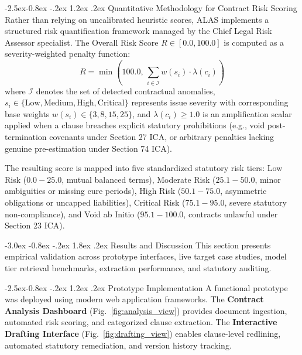 \documentclass[3p,times,procedia]{elsarticle}
\makeatletter
\renewcommand\section{\@startsection {section}{1}{\z@}%
                                   {-3.0ex \@plus -0.8ex \@minus -.2ex}%
                                   {1.8ex \@plus.2ex}%
                                   {\fontsize{10}{12}\selectfont\bfseries\scshape}}
\renewcommand\subsection{\@startsection{subsection}{2}{\z@}%
                                     {-2.5ex\@plus -0.8ex \@minus -.2ex}%
                                     {1.2ex \@plus .2ex}%
                                     {\fontsize{10}{12}\selectfont\itshape}}
\makeatother
\begin{document}
\subsection{Quantitative Methodology for Contract Risk Scoring}
Rather than relying on uncalibrated heuristic scores, ALAS implements a structured risk quantification framework managed by the Chief Legal Risk Assessor specialist. The Overall Risk Score $R \in [0.0, 100.0]$ is computed as a severity-weighted penalty function:
\begin{equation}
R = \min\left(100.0, \, \sum_{i \in \mathcal{I}} w(s_i) \cdot \lambda(c_i) \right)
\end{equation}
where $\mathcal{I}$ denotes the set of detected contractual anomalies, $s_i \in \{\text{Low}, \text{Medium}, \text{High}, \text{Critical}\}$ represents issue severity with corresponding base weights $w(s_i) \in \{3, 8, 15, 25\}$, and $\lambda(c_i) \ge 1.0$ is an amplification scalar applied when a clause breaches explicit statutory prohibitions (e.g., void post-termination covenants under Section 27 ICA, or arbitrary penalties lacking genuine pre-estimation under Section 74 ICA). 

The resulting score is mapped into five standardized statutory risk tiers: Low Risk ($0.0 - 25.0$, mutual balanced terms), Moderate Risk ($25.1 - 50.0$, minor ambiguities or missing cure periods), High Risk ($50.1 - 75.0$, asymmetric obligations or uncapped liabilities), Critical Risk ($75.1 - 95.0$, severe statutory non-compliance), and Void ab Initio ($95.1 - 100.0$, contracts unlawful under Section 23 ICA).

\section{Results and Discussion}
This section presents empirical validation across prototype interfaces, live target case studies, model tier retrieval benchmarks, extraction performance, and statutory auditing.

\subsection{Prototype Implementation}
A functional prototype was deployed using modern web application frameworks. The \textbf{Contract Analysis Dashboard} (Fig.~\ref{fig:analysis_view}) provides document ingestion, automated risk scoring, and categorized clause extraction. The \textbf{Interactive Drafting Interface} (Fig.~\ref{fig:drafting_view}) enables clause-level redlining, automated statutory remediation, and version history tracking.
\end{document}
